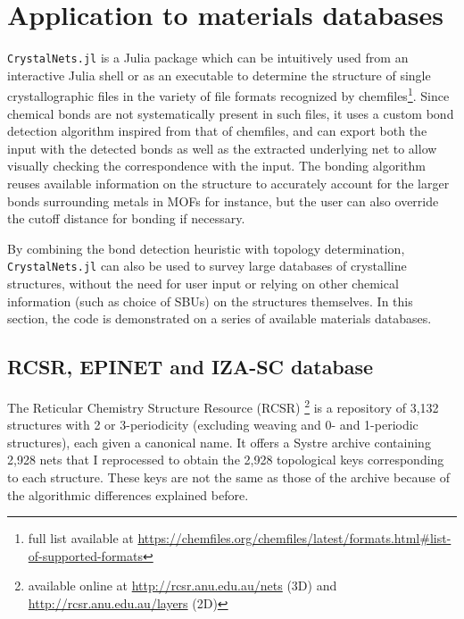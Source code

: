 \documentclass[main.tex]{subfiles}
\begin{document}


\section{Application to materials databases}

\texttt{CrystalNets.jl} is a Julia package which can be intuitively used from an interactive Julia shell or as an executable to determine the structure of single crystallographic files in the variety of file formats recognized by chemfiles\footnote{full list available at \url{https://chemfiles.org/chemfiles/latest/formats.html\#list-of-supported-formats}}. Since chemical bonds are not systematically present in such files, it uses a custom bond detection algorithm inspired from that of chemfiles, and can export both the input with the detected bonds as well as the extracted underlying net to allow visually checking the correspondence with the input. The bonding algorithm reuses available information on the structure to accurately account for the larger bonds surrounding metals in MOFs for instance, but the user can also override the cutoff distance for bonding if necessary.

By combining the bond detection heuristic with topology determination, \texttt{CrystalNets.jl} can also be used to survey large databases of crystalline structures, without the need for user input or relying on other chemical information (such as choice of SBUs) on the structures themselves. In this section, the code is demonstrated on a series of available materials databases.

\subsection{RCSR, EPINET and IZA-SC database}

The Reticular Chemistry Structure Resource (RCSR) \autocite{RCSR} \footnote{available online at \url{http://rcsr.anu.edu.au/nets} (3D) and \url{http://rcsr.anu.edu.au/layers} (2D)} is a repository of 3,132 structures with 2 or 3-periodicity (excluding weaving and 0- and 1-periodic structures), each given a canonical name. It offers a Systre archive containing 2,928 nets that I reprocessed to obtain the 2,928 topological keys corresponding to each structure. These keys are not the same as those of the archive because of the algorithmic differences explained before.
\end{document}
